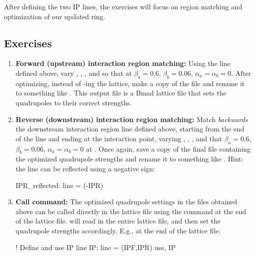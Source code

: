 \documentclass{hitec}     %
\begin{document}
{After defining the two IP lines, the exercises will focus on region matching and optimization of our updated ring. 
\subsection{Exercises}

\begin{enumerate}[leftmargin=*]
%
\item {\bf Forward (upstream) interaction region matching:} Using the  line defined above, vary , , , and  so that at  $\beta_a=0.6$, $\beta_b=0.06$, $\alpha_a=\alpha_b=0$. After optimizing, instead of -ing the lattice, make a copy of the  file and rename it to something like . This output file is a Bmad lattice file that sets the quadrupoles to their correct strengths.
%
\item {\bf Reverse (downstream) interaction region matching:} Match \textit{backwards} the downstream interaction region line  defined above, starting from the end of the line and ending at the interaction point, varying , , , and  that $\beta_a=0.6$, $\beta_b=0.06$, $\alpha_a=\alpha_b=0$ at . Once again, save a copy of the final  file containing the optimized quadrupole strengths and rename it to something like . Hint: the line can be reflected using a negative sign:
\begin{code}
IPR_reflected: line = (-IPR)
\end{code}
%
\item {\bf Call command:} The optimized quadrupole settings in the  files obtained above can be called directly in the lattice file using the  command at the end of the lattice file. \bmad will read in the entire lattice file, and then set the quadrupole strengths accordingly. E.g., at the end of the lattice file:
\begin{code}
! Define and use IP line
IP: line = (IPF,IPR)
use, IP


\end{code}
\end{enumerate}}
\end{document}
